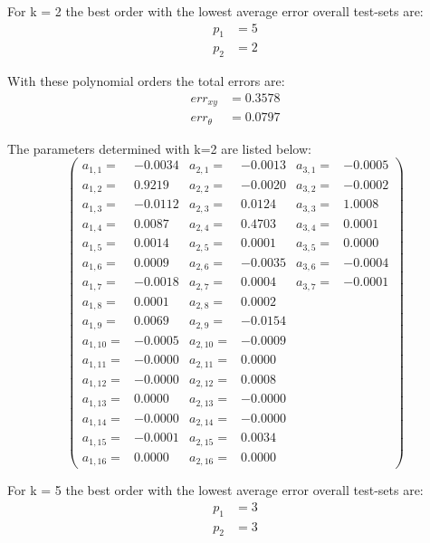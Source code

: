 \documentclass[conference]{IEEEtran}
\begin{document}
\begin{compactenum}[a)]

\item For k = 2 the best order with the lowest average error overall test-sets are:
\begin{align}
	p_1 & = 5\\
	p_2 & = 2
\end{align}

With these polynomial orders the total errors are:
\begin{align}
	err_{xy} & = 0.3578\\
	err_{\theta} & = 0.0797
\end{align}

The parameters determined with k=2 are listed below:
\vspace{20pt}
$$
\left(
\scriptscriptstyle{
\begin{smallmatrix}
a_{1,1} =& -0.0034 	& a_{2,1} =& -0.0013 & a_{3,1} =& -0.0005\\
a_{1,2} =&  0.9219  & a_{2,2} =& -0.0020 & a_{3,2} =& -0.0002\\
a_{1,3} =& -0.0112 	& a_{2,3} =&  0.0124 & a_{3,3} =&  1.0008\\
a_{1,4} =&  0.0087  & a_{2,4} =&  0.4703 & a_{3,4} =&  0.0001\\
a_{1,5} =&  0.0014  & a_{2,5} =&  0.0001 & a_{3,5} =&  0.0000\\
a_{1,6} =&  0.0009  & a_{2,6} =& -0.0035 & a_{3,6} =& -0.0004\\
a_{1,7} =& -0.0018 	& a_{2,7} =&  0.0004 & a_{3,7} =& -0.0001\\
a_{1,8} =&  0.0001  & a_{2,8} =&  0.0002	\\
a_{1,9} =&  0.0069  & a_{2,9} =& -0.0154	\\
a_{1,10} =&-0.0005 	& a_{2,10} =&-0.0009	\\
a_{1,11} =&-0.0000 	& a_{2,11} =& 0.0000	\\
a_{1,12} =&-0.0000 	& a_{2,12} =& 0.0008	\\
a_{1,13} =& 0.0000  & a_{2,13} =&-0.0000	\\
a_{1,14} =&-0.0000 	& a_{2,14} =&-0.0000	\\
a_{1,15} =&-0.0001 	& a_{2,15} =& 0.0034	\\
a_{1,16} =& 0.0000  & a_{2,16} =& 0.0000	
\end{smallmatrix}}
\right)
$$
\vspace{20pt}

\item For k = 5 the best order with the lowest average error overall test-sets are:
\begin{align}
	p_1 & = 3\\
	p_2 & = 3
\end{align}


\end{compactenum}
\end{document}
